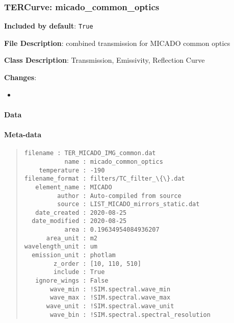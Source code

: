 \subsubsection{TERCurve: \textquotedbl{}micado\_common\_optics\textquotedbl{}%
  \label{tercurve-micado-common-optics}%
}

\textbf{Included by default}: \texttt{True}

\textbf{File Description}: combined transmission for MICADO common optics

\textbf{Class Description}: Transmission, Emissivity, Reflection Curve

\textbf{Changes}:

\begin{itemize}
\item \end{itemize}


\paragraph{Data%
  \label{id1}%
}


\paragraph{Meta-data%
  \label{id2}%
}

\begin{quote}
\begin{alltt}
\begin{lstlisting}[frame=single]
       filename : TER_MICADO_IMG_common.dat
           name : micado_common_optics
    temperature : -190
filename_format : filters/TC_filter_\{\}.dat
   element_name : MICADO
         author : Auto-compiled from source
         source : LIST_MICADO_mirrors_static.dat
   date_created : 2020-08-25
  date_modified : 2020-08-25
           area : 0.19634954084936207
      area_unit : m2
wavelength_unit : um
  emission_unit : photlam
        z_order : [10, 110, 510]
        include : True
   ignore_wings : False
       wave_min : !SIM.spectral.wave_min
       wave_max : !SIM.spectral.wave_max
      wave_unit : !SIM.spectral.wave_unit
       wave_bin : !SIM.spectral.spectral_resolution
\end{lstlisting}
\end{alltt}
\end{quote}
